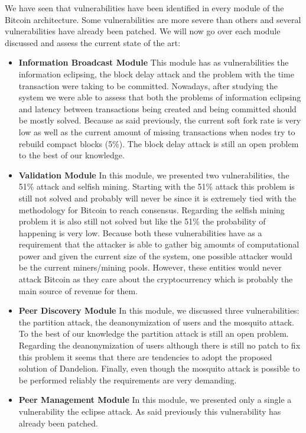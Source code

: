 We have seen that vulnerabilities have been identified in every module of the Bitcoin architecture. Some vulnerabilities are more severe than others and several vulnerabilities have already been patched. We will now go over each module discussed and assess the current state of the art:
\begin{itemize}
    \item \textbf{Information Broadcast Module} This module has as vulnerabilities the information eclipsing, the block delay attack and the problem with the time transaction were taking to be committed. Nowadays, after studying the system we were able to assess that both the problems of information eclipsing and latency between transactions being created and being committed should be mostly solved. Because as said previously, the current soft fork rate is very low as well as the current amount of missing transactions when nodes try to rebuild compact blocks (5\%). The block delay attack is still an open problem to the best of our knowledge.
    \item \textbf{Validation Module} In this module, we presented two vulnerabilities, the 51\% attack and selfish mining. Starting with the 51\% attack this problem is still not solved and probably will never be since it is extremely tied with the methodology for Bitcoin to reach consensus. Regarding the selfish mining problem it is also still not solved but like the 51\% the probability of happening is very low. Because both these vulnerabilities have as a requirement that the attacker is able to gather big amounts of computational power and given the current size of the system, one possible attacker would be the current miners/mining pools. However, these entities would never attack Bitcoin as they care about the cryptocurrency which is probably the main source of revenue for them.
    \item \textbf{Peer Discovery Module} In this module, we discussed three vulnerabilities: the partition attack, the deanonymization of users and the mosquito attack. To the best of our knowledge the partition attack is still an open problem. Regarding the deanonymization of users although there is still no patch to fix this problem it seems that there are tendencies to adopt the proposed solution of Dandelion. Finally, even though the mosquito attack is possible to be performed reliably the requirements are very demanding.
    \item \textbf{Peer Management Module} In this module, we presented only a single a vulnerability the eclipse attack. As said previously this vulnerability has already been patched. 
\end{itemize}




